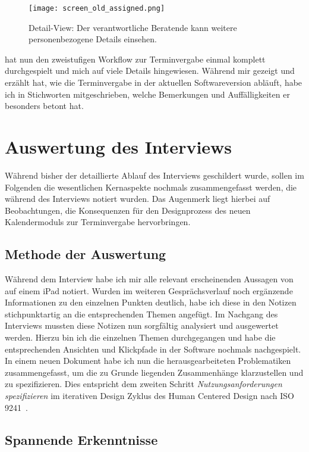 \begin{figure}[H]
    \caption{Detail-View: Der verantwortliche Beratende kann weitere personenbezogene Details einsehen.}
    \centering
    \texttt{[image: screen\_old\_assigned.png]}
\end{figure}

\ipName hat nun den zweistufigen Workflow zur Terminvergabe einmal komplett
durchgespielt und mich auf viele Details hingewiesen. Während \ipName mir
gezeigt und erzählt hat, wie die Terminvergabe in der aktuellen Softwareversion
abläuft, habe ich in Stichworten mitgeschrieben, welche Bemerkungen und
Auffälligkeiten er besonders betont hat.

\section{Auswertung des Interviews}

Während bisher der detaillierte Ablauf des Interviews geschildert wurde, sollen
im Folgenden die wesentlichen Kernaspekte nochmals zusammengefasst werden, die
während des Interviews notiert wurden. Das Augenmerk liegt hierbei auf
Beobachtungen, die Konsequenzen für den Designprozess des neuen Kalendermoduls
zur Terminvergabe hervorbringen.

\subsection*{Methode der Auswertung}
Während dem Interview habe ich mir alle relevant erscheinenden Aussagen von
\ipName auf einem iPad notiert. Wurden im weiteren Gesprächsverlauf noch
ergänzende Informationen zu den einzelnen Punkten deutlich, habe ich diese in
den Notizen stichpunktartig an die entsprechenden Themen angefügt. Im Nachgang
des Interviews mussten diese Notizen nun sorgfältig analysiert und ausgewertet
werden. Hierzu bin ich die einzelnen Themen durchgegangen und habe die
entsprechenden Ansichten und Klickpfade in der Software nochmals nachgespielt.
In einem neuen Dokument habe ich nun die herausgearbeiteten Problematiken
zusammengefasst, um die zu Grunde liegenden Zusammenhänge klarzustellen und zu
spezifizieren. Dies entspricht dem zweiten Schritt
\textit{Nutzungsanforderungen spezifizieren} im iterativen Design Zyklus des
Human Centered Design nach ISO 9241~\cite{ISO9241}.

\subsection*{Spannende Erkenntnisse}
\label{subsection:SpannendeErkenntnisse}

